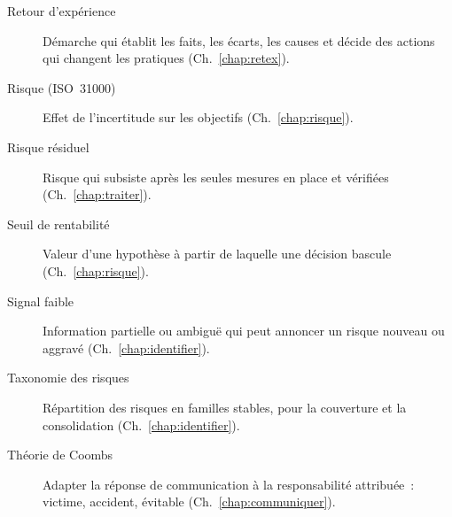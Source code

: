 \begin{description}
    \item[Retour d'expérience] Démarche qui établit les faits, les écarts, les causes et décide des actions qui changent les pratiques (Ch.~\ref{chap:retex}).
    \item[Risque (ISO~31000)] Effet de l'incertitude sur les objectifs (Ch.~\ref{chap:risque}).
    \item[Risque résiduel] Risque qui subsiste après les seules mesures en place et vérifiées (Ch.~\ref{chap:traiter}).
    \item[Seuil de rentabilité] Valeur d'une hypothèse à partir de laquelle une décision bascule (Ch.~\ref{chap:risque}).
    \item[Signal faible] Information partielle ou ambiguë qui peut annoncer un risque nouveau ou aggravé (Ch.~\ref{chap:identifier}).
    \item[Taxonomie des risques] Répartition des risques en familles stables, pour la couverture et la consolidation (Ch.~\ref{chap:identifier}).
    \item[Théorie de Coombs] Adapter la réponse de communication à la responsabilité attribuée~: victime, accident, évitable (Ch.~\ref{chap:communiquer}).
\end{description}
